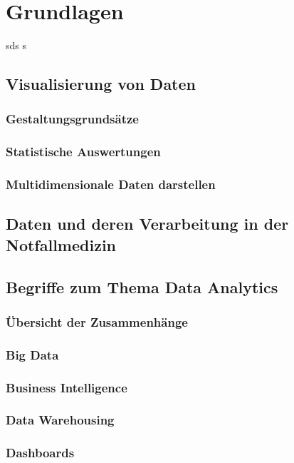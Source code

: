 \chapter{Grundlagen}
\label{chap:Grundlagen}
\minitoc\pagebreak
\lipsum[1-42]
sds \cite{Maconochie.2015} s
\section{Visualisierung von Daten}
\subsection{Gestaltungsgrundsätze}
\subsection{Statistische Auswertungen}
\subsection{Multidimensionale Daten darstellen}

\section{Daten und deren Verarbeitung in der Notfallmedizin} %

\section{Begriffe zum Thema Data Analytics}
\subsection{Übersicht der Zusammenhänge}
\subsection{Big Data}
\subsection{Business Intelligence}
\subsection{Data Warehousing}
\subsection{Dashboards}
